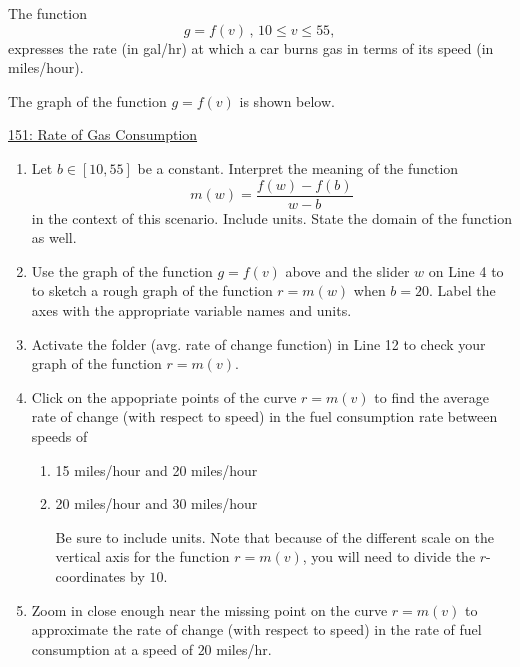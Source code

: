 \documentclass{ximera}
\begin{document}
\begin{question}  \label{Q4gdfetdsfsdfhfg4tr4}
The function
\[
      g = f(v)  \, , \, 10\leq v \leq 55 ,                     %
\]
expresses the rate (in gal/hr) at which a car burns gas in terms of its speed (in miles/hour).

The graph of the function $g=f(v)$ is shown below.

\begin{onlineOnly}
    \begin{center}
\end{center}
\end{onlineOnly}

\href{https://www.desmos.com/calculator/3ubcc1x8kh}{151: Rate of Gas Consumption}

\begin{enumerate}

\item Let $b\in [10,55]$ be a constant. Interpret the meaning of the function
\[
   m(w) =  \frac{f(w)-f(b)}{w-b}
\]
in the context of this scenario. Include units. State the domain of the function as well.

\item Use the graph of the function $g=f(v)$ above and the slider $w$ on Line 4 to to sketch a rough graph of the function $r=m(w)$ when $b=20$. Label the axes with the appropriate variable names and units.

\item Activate the folder (avg. rate of change function) in Line 12 to check your graph of the function $r=m(v)$. 

\item Click on the appopriate points of the curve $r=m(v)$ to find the average rate of change (with respect to speed) in the fuel consumption rate between speeds of  

\begin{enumerate}
\item 15 miles/hour and 20 miles/hour

\item 20 miles/hour and 30 miles/hour

Be sure to include units. Note that because of the different  scale on the vertical axis for the function $r=m(v)$, you will need to divide the $r$-coordinates by $10$.

\end{enumerate}

\item Zoom in close enough near the missing point on the curve $r=m(v)$ to approximate the rate of change (with respect to speed) in the rate of fuel consumption at a speed of $20$ miles/hr.


\end{enumerate}
\end{question}
\end{document}
